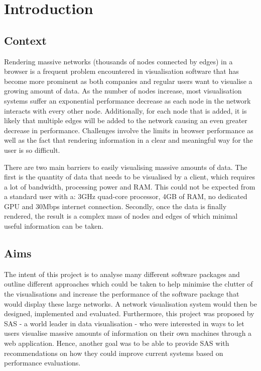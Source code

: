 \documentclass[../dissertation.tex]{subfiles}
\begin{document}
\chapter{Introduction}

\section{Context}

Rendering massive networks (thousands of nodes connected by edges) in a browser is a frequent problem encountered in visualisation software that has become more prominent as both companies and regular users want to visualise a growing amount of data. As the number of nodes increase, most visualisation systems suffer an exponential performance decrease as each node in the network interacts with every other node. Additionally, for each node that is added, it is likely that multiple edges will be added to the network causing an even greater decrease in performance. Challenges involve the limits in browser performance as well as the fact that rendering information in a clear and meaningful way for the user is so difficult. 

There are two main barriers to easily visualising massive amounts of data. The first is the quantity of data that needs to be visualised by a client, which requires a lot of bandwidth, processing power and RAM. This could not be expected from a standard user with a: 3GHz quad-core processor, 4GB of RAM, no dedicated GPU and 30Mbps internet connection. Secondly, once the data is finally rendered, the result is a complex mass of nodes and edges of which minimal useful information can be taken. 

\section{Aims}

The intent of this project is to analyse many different software packages and outline different approaches which could be taken to help minimise the clutter of the visualisations and increase the performance of the software package that would display these large networks. A network visualisation system would then be designed, implemented and evaluated. Furthermore, this project was proposed by SAS \cite{sas} - a world leader in data visualisation - who were interested in ways to let users visualise massive amounts of information on their own machines through a web application. Hence, another goal was to be able to provide SAS with recommendations on how they could improve current systems based on performance evaluations.
\end{document}
